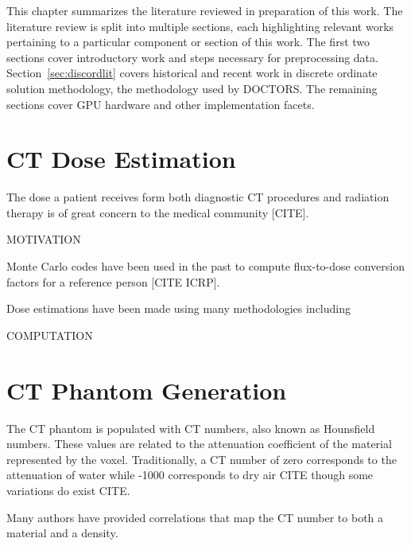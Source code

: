 
This chapter summarizes the literature reviewed in preparation of this work. The literature review is split into multiple sections, each highlighting relevant works pertaining to a particular component or section of this work. The first two sections cover introductory work and steps necessary for preprocessing data. Section~\ref{sec:discordlit} covers historical and recent work in discrete ordinate solution methodology, the methodology used by DOCTORS. The remaining sections cover GPU hardware and other implementation facets.

\section{CT Dose Estimation}
The dose a patient receives form both diagnostic CT procedures and radiation therapy is of great concern to the medical community [CITE]. 

MOTIVATION

Monte Carlo codes have been used in the past to compute flux-to-dose conversion factors for a reference person [CITE ICRP].

Dose estimations have been made using many methodologies including 

COMPUTATION

\section{CT Phantom Generation}
The CT phantom is populated with CT numbers, also known as Hounsfield numbers. These values are related to the attenuation coefficient of the material represented by the voxel. Traditionally, a CT number of zero corresponds to the attenuation of water while -1000 corresponds to dry air CITE though some variations do exist CITE.

Many authors have provided correlations that map the CT number to both a material and a density.

